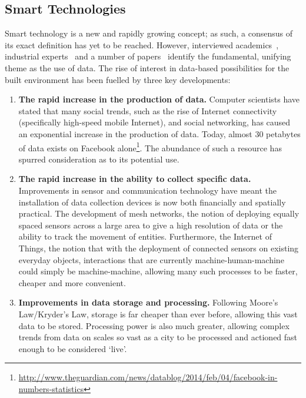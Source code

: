 \documentclass[journal]{IEEEtran}
\begin{document}
\subsection{Smart Technologies}

Smart technology is a new and rapidly growing concept; as such, a
consensus of its exact definition has yet to be reached. However,
interviewed academics~\cite{elecgen:2013}, industrial
experts~\cite{buscher:2014} and a number of
papers~\cite{komninos:2002,arup-et-al:2011,harrison+abbottdonnelly:2011,batty-et-al:2012}
identify the fundamental, unifying theme as the use of data. The rise
of interest in data-based possibilities for the built environment has
been fuelled by three key developments:\\

\begin{enumerate}
\item {\textbf{The rapid increase in the production of data.}}
  Computer scientists have stated that many social trends, such as the
  rise of Internet connectivity (specifically high-speed mobile
  Internet), and social networking, has caused an exponential
  increase in the production of data. Today, almost 30 petabytes of
  data exists on Facebook alone\footnote{\url{http://www.theguardian.com/news/datablog/2014/feb/04/facebook-in-numbers-statistics}}. The abundance of such a
  resource has spurred consideration as to its potential use.
\item {\textbf{The rapid increase in the ability to collect specific
      data.}} Improvements in sensor and communication technology have
  meant the installation of data collection devices is now both financially and
  spatially practical. The development of mesh networks, the notion of deploying equally
  spaced sensors across a large area to give a high resolution of data
  or the ability to track the movement of entities. Furthermore, the
  Internet of Things, the notion that with the deployment of
  connected sensors on existing everyday objects, interactions that
  are currently machine-human-machine could simply be machine-machine,
  allowing many such processes to be faster, cheaper and  more
  convenient. 
\item {\textbf{Improvements in data storage and processing.}} Following
  Moore’s Law/Kryder's Law, storage is far cheaper than ever before, allowing
  this vast data to be stored. Processing power is also much greater,
  allowing complex trends from data on scales so vast as a city to be
  processed and actioned fast enough to be considered `live'.
\end{enumerate}
\end{document}
